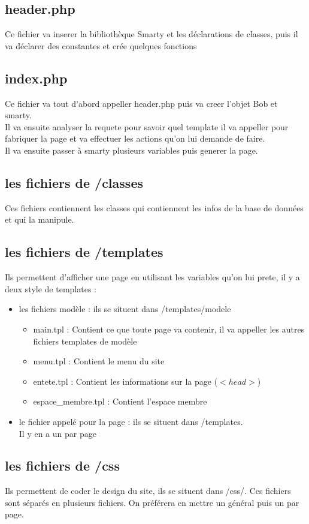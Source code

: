\subsection{header.php}
				Ce fichier va inserer la bibliothèque Smarty et les déclarations de classes, puis il va déclarer des constantes et crée quelques fonctions  
			\subsection{index.php}
				Ce fichier va tout d'abord appeller header.php puis va creer l'objet Bob et smarty.\\
				Il va ensuite analyser la requete pour savoir quel template il va appeller pour fabriquer la page et va effectuer les actions qu'on lui demande de faire.\\
				Il va ensuite passer à smarty plusieurs variables puis generer la page.
			\subsection{les fichiers de /classes}
				Ces fichiers contiennent les classes qui contiennent les infos de la base de données et qui la manipule.
			\subsection{les fichiers de /templates}
				Ils permettent d'afficher une page en utilisant les variables qu'on lui prete, il y a deux style de templates : 
				\begin{itemize}
				\item les fichiers modèle : ils se situent dans /templates/modele
				\begin{itemize}
					\item main.tpl : Contient ce que toute page va contenir, il va appeller les autres fichiers templates de modèle
					\item menu.tpl : Contient le menu du site
					\item entete.tpl  : Contient les informations sur la page ($<head>$)
					\item espace\_membre.tpl : Contient l'espace membre\\
				\end{itemize}
					
				\item le fichier appelé pour la page : ils se situent dans /templates.\\
				Il y en a un par page
				\end{itemize}
			\subsection{les fichiers de /css}
				Ils permettent de coder le design du site, ils se situent dans /css/. Ces fichiers sont séparés en plusieurs fichiers. On préférera en mettre un général puis un par page.